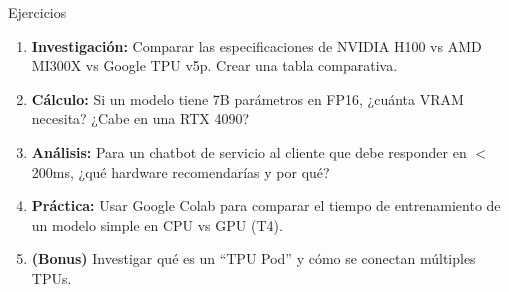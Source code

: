 \documentclass[aspectratio=169]{beamer}
\begin{document}
\begin{frame}{Ejercicios}
    \begin{enumerate}
        \setlength\itemsep{0.7em}
        \item \textbf{Investigación:} Comparar las especificaciones de NVIDIA H100 vs AMD MI300X vs Google TPU v5p. Crear una tabla comparativa.
        
        \item \textbf{Cálculo:} Si un modelo tiene 7B parámetros en FP16, ¿cuánta VRAM necesita? ¿Cabe en una RTX 4090?
        
        \item \textbf{Análisis:} Para un chatbot de servicio al cliente que debe responder en $<$200ms, ¿qué hardware recomendarías y por qué?
        
        \item \textbf{Práctica:} Usar Google Colab para comparar el tiempo de entrenamiento de un modelo simple en CPU vs GPU (T4).
        
        \item \textbf{(Bonus)} Investigar qué es un ``TPU Pod'' y cómo se conectan múltiples TPUs.
    \end{enumerate}
\end{frame}
\end{document}

